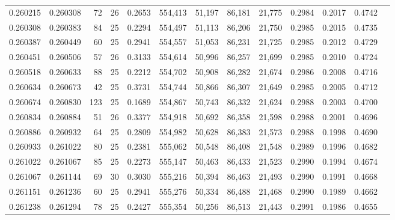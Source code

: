 \begin{tabular}{rrrrrrrrrrrrr}
0.260215 & 0.260308 &  72 &  26 &                                     0.2653 & 554,413 &  51,197 &  86,181 &  21,775 & 0.2984 & 0.2017 & 0.4742 \\
0.260308 & 0.260383 &  84 &  25 &                                     0.2294 & 554,497 &  51,113 &  86,206 &  21,750 & 0.2985 & 0.2015 & 0.4735 \\
0.260387 & 0.260449 &  60 &  25 &                                     0.2941 & 554,557 &  51,053 &  86,231 &  21,725 & 0.2985 & 0.2012 & 0.4729 \\
0.260451 & 0.260506 &  57 &  26 &                                     0.3133 & 554,614 &  50,996 &  86,257 &  21,699 & 0.2985 & 0.2010 & 0.4724 \\
0.260518 & 0.260633 &  88 &  25 &                                     0.2212 & 554,702 &  50,908 &  86,282 &  21,674 & 0.2986 & 0.2008 & 0.4716 \\
0.260634 & 0.260673 &  42 &  25 &                                     0.3731 & 554,744 &  50,866 &  86,307 &  21,649 & 0.2985 & 0.2005 & 0.4712 \\
0.260674 & 0.260830 & 123 &  25 &                                     0.1689 & 554,867 &  50,743 &  86,332 &  21,624 & 0.2988 & 0.2003 & 0.4700 \\
0.260834 & 0.260884 &  51 &  26 &                                     0.3377 & 554,918 &  50,692 &  86,358 &  21,598 & 0.2988 & 0.2001 & 0.4696 \\
0.260886 & 0.260932 &  64 &  25 &                                     0.2809 & 554,982 &  50,628 &  86,383 &  21,573 & 0.2988 & 0.1998 & 0.4690 \\
0.260933 & 0.261022 &  80 &  25 &                                     0.2381 & 555,062 &  50,548 &  86,408 &  21,548 & 0.2989 & 0.1996 & 0.4682 \\
0.261022 & 0.261067 &  85 &  25 &                                     0.2273 & 555,147 &  50,463 &  86,433 &  21,523 & 0.2990 & 0.1994 & 0.4674 \\
0.261067 & 0.261144 &  69 &  30 &                                     0.3030 & 555,216 &  50,394 &  86,463 &  21,493 & 0.2990 & 0.1991 & 0.4668 \\
0.261151 & 0.261236 &  60 &  25 &                                     0.2941 & 555,276 &  50,334 &  86,488 &  21,468 & 0.2990 & 0.1989 & 0.4662 \\
0.261238 & 0.261294 &  78 &  25 &                                     0.2427 & 555,354 &  50,256 &  86,513 &  21,443 & 0.2991 & 0.1986 & 0.4655 \\

\end{tabular}
